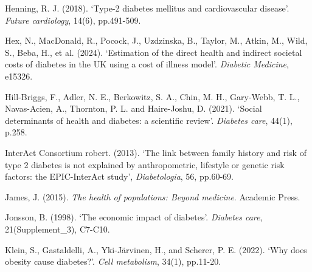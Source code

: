 \begin{Reference}
\begin{flushleft}
Henning, R. J. (2018). `Type-2 diabetes mellitus and cardiovascular disease'. \textit{Future cardiology}, 14(6), pp.491-509.
\end{flushleft}
\vspace{2pt}


\begin{flushleft}
Hex, N., MacDonald, R., Pocock, J., Uzdzinska, B., Taylor, M., Atkin, M., Wild, S., Beba, H., et al. (2024). `Estimation of the direct health and indirect societal costs of diabetes in the UK using a cost of illness model'. \textit{Diabetic Medicine}, e15326.
\end{flushleft}
\vspace{2pt}


\begin{flushleft}
Hill-Briggs, F., Adler, N. E., Berkowitz, S. A., Chin, M. H., Gary-Webb, T. L., Navas-Acien, A., Thornton, P. L. and Haire-Joshu, D. (2021). `Social determinants of health and diabetes: a scientific review'. \textit{Diabetes care}, 44(1), p.258.
\end{flushleft}
\vspace{2pt}


\begin{flushleft}
InterAct Consortium robert. (2013). `The link between family history and risk of type 2 diabetes is not explained by anthropometric, lifestyle or genetic risk factors: the EPIC-InterAct study', \textit{Diabetologia}, 56, pp.60-69.
\end{flushleft}
\vspace{2pt}


\begin{flushleft}
James, J. (2015). \textit{The health of populations: Beyond medicine}. Academic Press.
\end{flushleft}
\vspace{2pt}


\begin{flushleft}
Jonsson, B. (1998). `The economic impact of diabetes'. \textit{Diabetes care}, 21(Supplement\_3), C7-C10.
\end{flushleft}
\vspace{2pt}


\begin{flushleft}
Klein, S., Gastaldelli, A., Yki-Järvinen, H., and Scherer, P. E. (2022). `Why does obesity cause diabetes?'. \textit{Cell metabolism}, 34(1), pp.11-20.
\end{flushleft}
\vspace{2pt}



\end{Reference}
